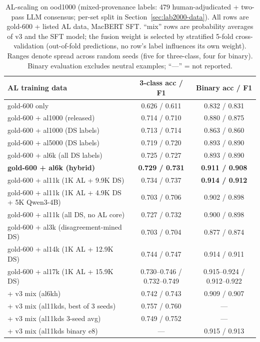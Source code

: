 \documentclass[11pt,a4paper]{article}
\begin{document}
\begin{table}[H]
\centering\footnotesize
\caption{AL-scaling on ood1000 (mixed-provenance labels: 479
human-adjudicated + two-pass LLM consensus; per-set split in
Section~\ref{sec:lab2000-data}). All rows are
gold-600 + listed AL data, MacBERT SFT. ``mix'' rows are probability
averages of v3 and the SFT model; the fusion weight is selected by
stratified 5-fold cross-validation (out-of-fold predictions, no row's
label influences its own weight). Ranges denote spread across random
seeds (five for three-class, four for binary).
Binary evaluation excludes neutral examples; ``---'' = not reported.}
\label{tab:al-scaling}
\begin{tabular}{lcc}
\toprule
AL training data & 3-class acc / F1 & Binary acc / F1 \\
\midrule
gold-600 only                        & 0.626 / 0.611 & 0.832 / 0.831 \\
gold-600 + al1000 (released)         & 0.714 / 0.710 & 0.880 / 0.875 \\
gold-600 + al1000 (DS labels)        & 0.713 / 0.714 & 0.863 / 0.860 \\
gold-600 + al5000 (DS labels)        & 0.719 / 0.720 & 0.893 / 0.890 \\
gold-600 + al6k (all DS labels)      & 0.725 / 0.727 & 0.893 / 0.890 \\
\textbf{gold-600 + al6k (hybrid)}    & \textbf{0.729 / 0.731} & \textbf{0.911 / 0.908} \\
gold-600 + al11k (1K AL + 9.9K DS)& 0.734 / 0.737 & \textbf{0.914 / 0.912} \\
gold-600 + al11k (1K AL + 4.9K DS + 5K Qwen3-4B) & 0.703 / 0.706 & 0.902 / 0.898 \\
gold-600 + al11k (all DS, no AL core) & 0.727 / 0.732 & 0.900 / 0.898 \\
gold-600 + al3k (disagreement-mined DS) & 0.703 / 0.704 & 0.877 / 0.874 \\
gold-600 + al14k (1K AL + 12.9K DS) & 0.744 / 0.747 & 0.914 / 0.911 \\
gold-600 + al17k (1K AL + 15.9K DS) & 0.730--0.746 / 0.732--0.749 & 0.915--0.924 / 0.912--0.922 \\
\midrule
+ v3 mix (al6kh)                     & 0.742 / 0.743 & 0.909 / 0.907 \\
+ v3 mix (al11kds, best of 3 seeds)    & 0.757 / 0.760 & --- \\
+ v3 mix (al11kds 3-seed avg)           & 0.749 / 0.752 & --- \\
+ v3 mix (al11kds binary e8)            & --- & 0.915 / 0.913 \\

\end{tabular}
\end{table}
\end{document}
